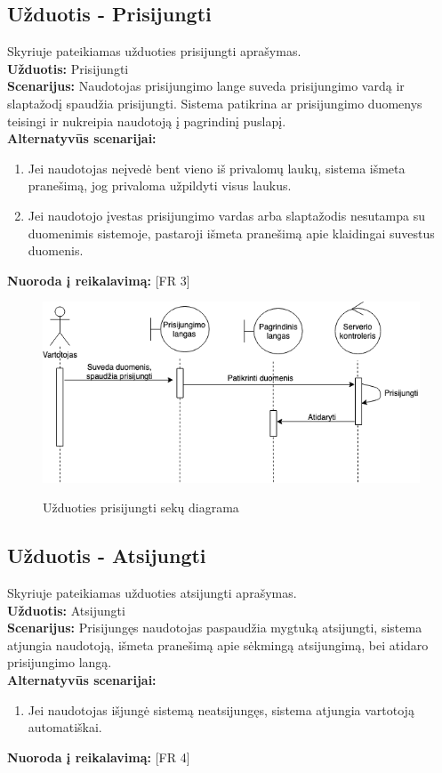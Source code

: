 \documentclass{VUMIFPSkursinis}
\begin{document}
	\subsection{Užduotis - Prisijungti}
	Skyriuje pateikiamas užduoties prisijungti aprašymas.\\
	\textbf{Užduotis:}  Prisijungti \\
	\textbf{Scenarijus:} Naudotojas prisijungimo lange suveda prisijungimo vardą ir slaptažodį spaudžia prisijungti. Sistema patikrina ar prisijungimo duomenys teisingi ir nukreipia naudotoją į pagrindinį puslapį. \\
	\textbf{Alternatyvūs scenarijai:}
	\begin{enumerate}
		\item Jei naudotojas neįvedė bent vieno iš privalomų laukų, sistema išmeta pranešimą, jog privaloma užpildyti visus laukus.
		\item Jei naudotojo įvestas prisijungimo vardas arba slaptažodis nesutampa su duomenimis sistemoje, pastaroji išmeta pranešimą apie klaidingai suvestus duomenis.
	\end{enumerate}
	\textbf{Nuoroda į reikalavimą: } [FR 3]
	
	\begin{figure}[H]
		\centering
		\includegraphics[width=\linewidth]{img/logInSequence.png}
		\label{fig:prisijungimas}
		\caption{Užduoties prisijungti sekų diagrama}
	\end{figure}

	\subsection{Užduotis - Atsijungti}
	Skyriuje pateikiamas užduoties atsijungti aprašymas.\\
	\textbf{Užduotis:}  Atsijungti \\
	\textbf{Scenarijus:} Prisijungęs naudotojas paspaudžia mygtuką atsijungti, sistema atjungia naudotoją, išmeta pranešimą apie sėkmingą atsijungimą, bei atidaro prisijungimo langą. \\
	\textbf{Alternatyvūs scenarijai:}
	\begin{enumerate}
		\item Jei naudotojas išjungė sistemą neatsijungęs, sistema atjungia vartotoją automatiškai.
	\end{enumerate}
	\textbf{Nuoroda į reikalavimą: } [FR 4]
	
\end{document}
